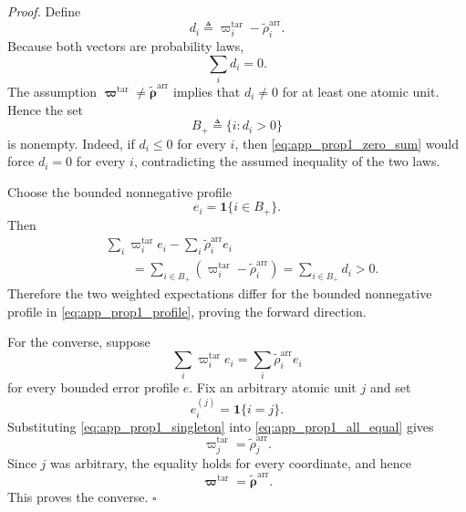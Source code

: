 \documentclass[letterpaper,journal]{IEEEtran}
\begin{document}
\noindent\emph{Proof.}
Define
\begin{equation}
    d_i
    \triangleq
    \varpi_i^{\mathrm{tar}}
    -
    \widetilde\rho_i^{\mathrm{arr}}.
    \label{eq:app_prop1_di}
\end{equation}
Because both vectors are probability laws,
\begin{equation}
    \sum_i d_i=0.
    \label{eq:app_prop1_zero_sum}
\end{equation}
The assumption
$\boldsymbol\varpi^{\mathrm{tar}}\neq
\widetilde{\boldsymbol\rho}^{\mathrm{arr}}$
implies that $d_i\neq0$ for at least one atomic unit.  Hence the set
\begin{equation}
    B_+
    \triangleq
    \{i:d_i>0\}
    \label{eq:app_prop1_positive_set}
\end{equation}
is nonempty.  Indeed, if $d_i\le0$ for every $i$, then
\eqref{eq:app_prop1_zero_sum} would force $d_i=0$ for every $i$, contradicting
the assumed inequality of the two laws.

Choose the bounded nonnegative profile
\begin{equation}
    e_i
    =
    \mathbf{1}\{i\in B_+\}.
    \label{eq:app_prop1_profile}
\end{equation}
Then
\begin{align}
 &
 \sum_i
 \varpi_i^{\mathrm{tar}}e_i
 -
 \sum_i
 \widetilde\rho_i^{\mathrm{arr}}e_i
 \nonumber\\
 &\qquad=
 \sum_{i\in B_+}
 \left(
 \varpi_i^{\mathrm{tar}}
 -
 \widetilde\rho_i^{\mathrm{arr}}
 \right)
 =
 \sum_{i\in B_+}d_i
 >0.
 \label{eq:app_prop1_difference}
\end{align}
Therefore the two weighted expectations differ for the bounded nonnegative
profile in \eqref{eq:app_prop1_profile}, proving the forward direction.

For the converse, suppose
\begin{equation}
    \sum_i \varpi_i^{\mathrm{tar}}e_i
    =
    \sum_i \widetilde\rho_i^{\mathrm{arr}}e_i
    \label{eq:app_prop1_all_equal}
\end{equation}
for every bounded error profile $e$.  Fix an arbitrary atomic unit $j$ and set
\begin{equation}
    e_i^{(j)}
    =
    \mathbf{1}\{i=j\}.
    \label{eq:app_prop1_singleton}
\end{equation}
Substituting \eqref{eq:app_prop1_singleton} into
\eqref{eq:app_prop1_all_equal} gives
\begin{equation}
    \varpi_j^{\mathrm{tar}}
    =
    \widetilde\rho_j^{\mathrm{arr}}.
    \label{eq:app_prop1_coordinate_equal}
\end{equation}
Since $j$ was arbitrary, the equality holds for every coordinate, and hence
\begin{equation}
    \boldsymbol\varpi^{\mathrm{tar}}
    =
    \widetilde{\boldsymbol\rho}^{\mathrm{arr}}.
\end{equation}
This proves the converse. \hfill$\square$
\end{document}
